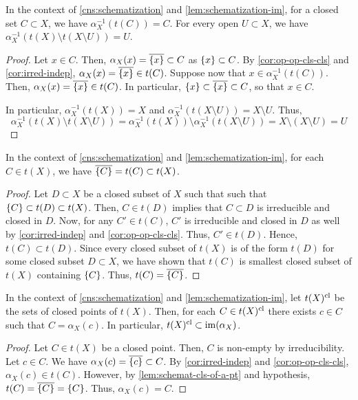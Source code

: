 \begin{lem}\label{lem:schematization-alpha-preim}
In the context of \cref{cns:schematization} and \cref{lem:schematization-im},
for a closed set $C \subset X$, we have
$\alpha_X^{-1}(t(C)) = C$. For every open $U \subset X$, we have
$\alpha_X^{-1}(t(X) \setminus t(X \setminus U)) = U$.
\end{lem}
\begin{proof}
Let $x \in C$. Then, $\alpha_X(x) = \cls{\set{x}} \subset C$
as $\set{x} \subset C$. By \cref{cor:op-op-cls-cls} and \cref{cor:irred-indep},
$\alpha_X(x) = \cls{\set{x}} \in t(C)$. Suppose now that
$x \in \alpha_X^{-1}(t(C))$. Then, $\alpha_X(x) = \cls{\set{x}} \in t(C)$.
In particular, $\set{x} \subset \cls{\set{x}} \subset C$, so that
$x \in C$.

In particular, $\alpha_X^{-1}(t(X)) = X$ and
$\alpha_X^{-1}(t(X \setminus U)) = X \setminus U$. Thus,
\[
\alpha_X^{-1}(t(X) \setminus t(X \setminus U))
= \alpha_X^{-1}(t(X)) \setminus \alpha_X^{-1}(t(X \setminus U))
= X \setminus (X \setminus U)
= U
\]
\end{proof}

\begin{lem}\label{lem:schemat-cls-of-a-pt}
In the context of \cref{cns:schematization} and \cref{lem:schematization-im},
for each $C \in t(X)$, we have $\cls{\set{C}} = t(C) \subset t(X)$.
\end{lem}
\begin{proof}
Let $D \subset X$ be a closed subset of $X$ such that
such that $\set{C} \subset t(D) \subset t(X)$. Then,
$C \in t(D)$ implies that $C \subset D$ is irreducible and closed in $D$.
Now, for any $C' \in t(C)$, $C'$ is irreducible and closed in
$D$ as well by \cref{cor:irred-indep} and \cref{cor:op-op-cls-cls}. Thus,
$C' \in t(D)$. Hence, $t(C) \subset t(D)$. Since every closed subset of
$t(X)$ is of the form $t(D)$ for some closed subset $D \subset X$, we have
shown that $t(C)$ is smallest closed subset of $t(X)$ containing
$\set{C}$. Thus, $t(C) = \cls{\set{C}}$.
\end{proof}

\begin{lem}\label{lem:schemat-cls-pt-im-alpha}
In the context of \cref{cns:schematization} and \cref{lem:schematization-im},
let $t(X)^{\mathrm{cl}}$ be the sets of closed points of $t(X)$.
Then, for each $C \in t(X)^{\mathrm{cl}}$ there exists $c \in C$ such that
$C = \alpha_X(c)$. In particular,
$t(X)^{\mathrm{cl}} \subset \mathrm{im}(\alpha_X)$.
\end{lem}
\begin{proof}
Let $C \in t(X)$ be a closed point. Then, $C$ is non-empty by irreducibility.
Let $c \in C$. We have $\alpha_X(c) = \cls{\set{c}} \subset C$.
By \cref{cor:irred-indep} and \cref{cor:op-op-cls-cls},
$\alpha_X(c) \in t(C)$. However, by \cref{lem:schemat-cls-of-a-pt} and
hypothesis, $t(C) = \cls{\set{C}} = \set{C}$. Thus, $\alpha_X(c) = C$.
\end{proof}

